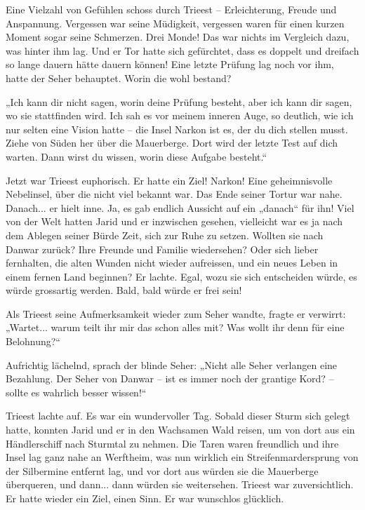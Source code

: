 Eine Vielzahl von Gefühlen schoss durch Trieest – Erleichterung, Freude und Anspannung. Vergessen war seine Müdigkeit, vergessen waren für einen kurzen Moment sogar seine Schmerzen. Drei Monde! Das war nichts im Vergleich dazu, was hinter ihm lag. Und er Tor hatte sich gefürchtet, dass es doppelt und dreifach so lange dauern hätte dauern können! Eine letzte Prüfung lag noch vor ihm, hatte der Seher behauptet. Worin die wohl bestand?

„Ich kann dir nicht sagen, worin deine Prüfung besteht, aber ich kann dir sagen, wo sie stattfinden wird. Ich sah es vor meinem inneren Auge, so deutlich, wie ich nur selten eine Vision hatte – die Insel Narkon ist es, der du dich stellen musst. Ziehe von Süden her über die Mauerberge. Dort wird der letzte Test auf dich warten. Dann wirst du wissen, worin diese Aufgabe besteht.“

Jetzt war Trieest euphorisch. Er hatte ein Ziel! Narkon! Eine geheimnisvolle Nebelinsel, über die nicht viel bekannt war. Das Ende seiner Tortur war nahe. Danach... er hielt inne. Ja, es gab endlich Aussicht auf ein „danach“ für ihn! Viel von der Welt hatten Jarid und er inzwischen gesehen, vielleicht war es ja nach dem Ablegen seiner Bürde Zeit, sich zur Ruhe zu setzen. Wollten sie nach Danwar zurück? Ihre Freunde und Familie wiedersehen? Oder sich lieber fernhalten, die alten Wunden nicht wieder aufreissen, und ein neues Leben in einem fernen Land beginnen? Er lachte. Egal, wozu sie sich entscheiden würde, es würde grossartig werden. Bald, bald würde er frei sein!

Als Trieest seine Aufmerksamkeit wieder zum Seher wandte, fragte er verwirrt: „Wartet... warum teilt ihr mir das schon alles mit? Was wollt ihr denn für eine Belohnung?“

Aufrichtig lächelnd, sprach der blinde Seher: „Nicht alle Seher verlangen eine Bezahlung. Der Seher von Danwar – ist es immer noch der grantige Kord? – sollte es wahrlich besser wissen!“

Trieest lachte auf. Es war ein wundervoller Tag. Sobald dieser Sturm sich gelegt hatte, konnten Jarid und er in den Wachsamen Wald reisen, um von dort aus ein Händlerschiff nach Sturmtal zu nehmen. Die Taren waren freundlich und ihre Insel lag ganz nahe an Werftheim, was nun wirklich ein Streifenmardersprung von der Silbermine entfernt lag, und vor dort aus würden sie die Mauerberge überqueren, und dann... dann würden sie weitersehen. Trieest war zuversichtlich. Er hatte wieder ein Ziel, einen Sinn. Er war wunschlos glücklich.

